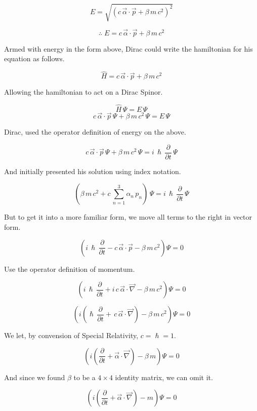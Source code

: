 \documentclass[a4page,12pt]{article}
\newcommand{\eqL}[2]{
	\begin{equation} \label{#1}
		#2
	\end{equation}
}
\begin{document}
		\[
			E = \sqrt{\left( c \,\vec{\alpha}\cdot \vec{p} + \beta\,m\,c^2 \right)^2}
		\]
		\eqL{diracEnergy}{
			\therefore \; E =  c \,\vec{\alpha}\cdot \vec{p} + \beta\,m\,c^2 
		}

	Armed with energy in the form above, Dirac could write the hamiltonian for his equation as follows.

		\[
			\hat{H} = c \,\vec{\alpha}\cdot \vec{p} + \beta\,m\,c^2 
		\]

	Allowing the hamiltonian to act on a Dirac Spinor.

		\[
			\hat{H} \, \Psi = E \, \Psi
		\]		
		\[
			c \,\vec{\alpha}\cdot \vec{p}\, \Psi  + \beta\,m\,c^2  \, \Psi = E \, \Psi
		\]

	Dirac, used the operator definition of energy on the above.

		\[
			c \,\vec{\alpha}\cdot \vec{p}\, \Psi + \beta\,m\,c^2  \, \Psi  = i \, \hslash \, \frac{\partial}{\partial t} \, \Psi 
		\]
	
	And initially presented his solution using index notation.

		\eqL{DiracEqnI}{
			\left(\beta\,m\,c^2 + c \, \sum_{n=1}^{3} \alpha_n\, p_n  \right)  \, \Psi  = i \, \hslash \, \frac{\partial}{\partial t} \, \Psi 
		}
	
	But to get it into a more familiar form, we move all terms to the right in vector form.

		\[
			\left( i \, \hslash \, \frac{\partial}{\partial t} - c \,\vec{\alpha}\cdot \vec{p} - \beta\,m\,c^2 \right) \Psi  = 0
		\]
	
	Use the operator definition of momentum.

		\[
			\left( i \, \hslash \, \frac{\partial}{\partial t} + i\, c \,\vec{\alpha}\cdot \vec{\nabla} - \beta\,m\,c^2 \right) \Psi  = 0
		\]

		\[
			 \left( i \left( \hslash \, \frac{\partial}{\partial t} + \, c \,\vec{\alpha}\cdot \vec{\nabla}\right) - \beta\,m\,c^2 \right) \Psi  = 0
		\]

	We let, by convension of Special Relativity, $c = \hslash = 1$.

		\[
			 \left( i \left( \frac{\partial}{\partial t} + \vec{\alpha}\cdot \vec{\nabla}\right) - \beta\,m \right) \Psi  = 0
		\]

	And since we found $\beta$ to be a $4\times 4$ identity matrix, we can omit it.
	
		\[
			 \left( i \left( \frac{\partial}{\partial t} + \vec{\alpha}\cdot \vec{\nabla}\right) - m \right) \Psi  = 0
		\]
\end{document}
